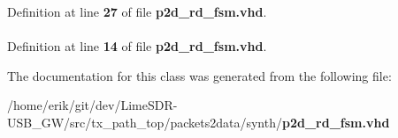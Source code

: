Definition at line {\bf 27} of file {\bf p2d\+\_\+rd\+\_\+fsm.\+vhd}.

\paragraph[{std\+\_\+logic\+\_\+1164}]{\hspace{0.3cm}{\ttfamily [Package]}}\label{classp2d__rd__fsm_acd03516902501cd1c7296a98e22c6fcb}


Definition at line {\bf 14} of file {\bf p2d\+\_\+rd\+\_\+fsm.\+vhd}.



The documentation for this class was generated from the following file\+:\begin{DoxyCompactItemize}
\item 
/home/erik/git/dev/\+Lime\+S\+D\+R-\/\+U\+S\+B\+\_\+\+G\+W/src/tx\+\_\+path\+\_\+top/packets2data/synth/{\bf p2d\+\_\+rd\+\_\+fsm.\+vhd}\end{DoxyCompactItemize}
